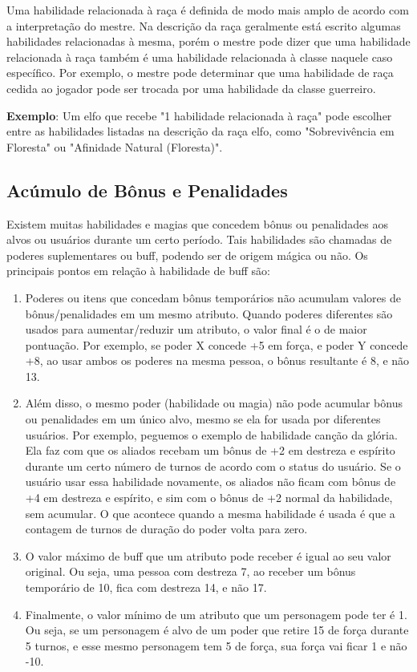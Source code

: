 Uma habilidade relacionada à raça é definida de modo mais amplo de acordo com a interpretação do mestre. Na descrição da raça geralmente está escrito algumas habilidades relacionadas à mesma, porém o mestre pode dizer que uma habilidade relacionada à raça também é uma habilidade relacionada à classe naquele caso específico. Por exemplo, o mestre pode determinar que uma habilidade de raça cedida ao jogador pode ser trocada por uma habilidade da classe guerreiro.

\textbf{Exemplo}: Um elfo que recebe "1 habilidade relacionada à raça" pode escolher entre as habilidades listadas na descrição da raça elfo, como "Sobrevivência em Floresta" ou "Afinidade Natural (Floresta)".

\subsection{Acúmulo de Bônus e Penalidades}

Existem muitas habilidades e magias que concedem bônus ou penalidades aos alvos ou usuários durante um certo período. Tais habilidades são chamadas de poderes suplementares ou buff, podendo ser de origem mágica ou não. Os principais pontos em relação à habilidade de buff são: 

\begin{enumerate}

\item Poderes ou itens que concedam bônus temporários não acumulam valores de bônus/penalidades em um mesmo atributo. Quando poderes diferentes são usados para aumentar/reduzir um atributo, o valor final é o de maior pontuação. Por exemplo, se poder X concede +5 em força, e poder Y concede +8, ao usar ambos os poderes na mesma pessoa, o bônus resultante é 8, e não 13.

\item Além disso, o mesmo poder (habilidade ou magia) não pode acumular bônus ou penalidades em um único alvo, mesmo se ela for usada por diferentes usuários. Por exemplo, peguemos o exemplo de habilidade canção da glória. Ela faz com que os aliados recebam um bônus de +2 em destreza e espírito durante um certo número de turnos de acordo com o status do usuário. Se o usuário usar essa habilidade novamente, os aliados não ficam com bônus de +4 em destreza e espírito, e sim com o bônus de +2 normal da habilidade, sem acumular. O que acontece quando a mesma habilidade é usada é que a contagem de turnos de duração do poder volta para zero.

\item O valor máximo de buff que um atributo pode receber é igual ao seu valor original. Ou seja, uma pessoa com destreza 7, ao receber um bônus temporário de 10, fica com destreza 14, e não 17.

\item Finalmente, o valor mínimo de um atributo que um personagem pode ter é 1. Ou seja, se um personagem é alvo de um poder que retire 15 de força durante 5 turnos, e esse mesmo personagem tem 5 de força, sua força vai ficar 1 e não -10.
\end{enumerate}


